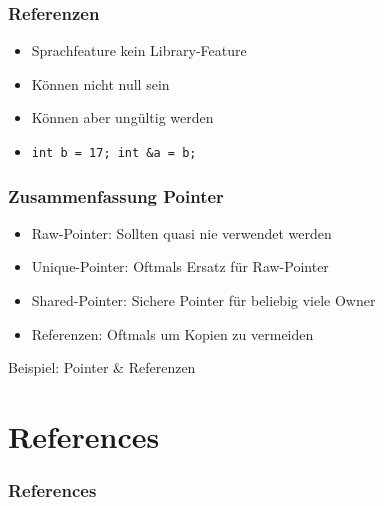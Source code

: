\documentclass[usenames,dvipsnames,svgnames,table,aspectratio=169]{beamer}
\begin{document}
\begin{frame}
    \frametitle{Referenzen}
    \begin{itemize}
        \item Sprachfeature kein Library-Feature
            \pause
        \item Können nicht null sein
            \pause
        \item Können aber ungültig werden
            \pause
        \item
            \lstinline{int b = 17; int &a = b;}
    \end{itemize}
\end{frame}

\begin{frame}
    \frametitle{Zusammenfassung Pointer}
    \begin{itemize}
        \item Raw-Pointer: Sollten quasi nie verwendet werden
            \pause
        \item Unique-Pointer: Oftmals Ersatz für Raw-Pointer
            \pause
        \item Shared-Pointer: Sichere Pointer für beliebig viele Owner
            \pause
        \item Referenzen: Oftmals um Kopien zu vermeiden
    \end{itemize}
\end{frame}

\begin{frame}
    \Huge{Beispiel: Pointer \& Referenzen}
\end{frame}

\section*{References}
\begin{frame}
  \frametitle{References}
  \printbibliography
\end{frame}
\end{document}
